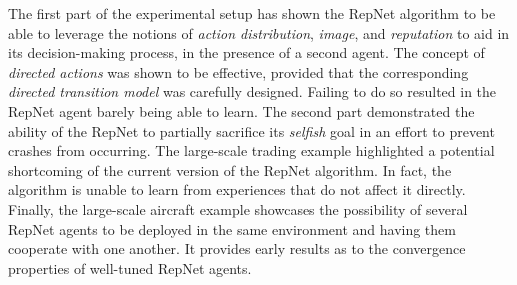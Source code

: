 The first part of the experimental setup has shown the RepNet algorithm to be able to leverage the notions of \textit{action distribution}, \textit{image}, and \textit{reputation} to aid in its decision-making process, in the presence of a second agent. The concept of \textit{directed actions} was shown to be effective, provided that the corresponding \textit{directed transition model} was carefully designed. Failing to do so resulted in the RepNet agent barely being able to learn.
The second part demonstrated the ability of the RepNet to partially sacrifice its \textit{selfish} goal in an effort to prevent crashes from occurring. 
The large-scale trading example highlighted a potential shortcoming of the current version of the RepNet algorithm. In fact, the algorithm is unable to learn from experiences that do not affect it directly. 
Finally, the large-scale aircraft example showcases the possibility of several RepNet agents to be deployed in the same environment and having them cooperate with one another. It provides early results as to the convergence properties of well-tuned RepNet agents.